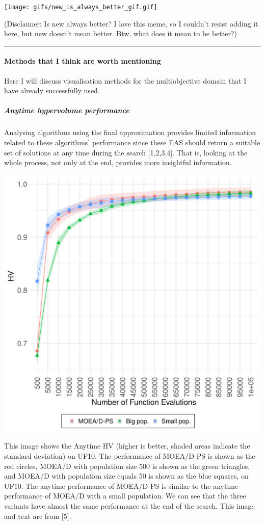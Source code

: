 \documentclass[
]{article}
\begin{document}
\texttt{[image: gifs/new\_is\_always\_better\_gif.gif]}

(Disclaimer: Is new always better? I love this meme, so I couldn't
resist adding it here, but new doesn't mean better. Btw, what does it
mean to be better?)

\begin{center}\rule{0.5\linewidth}{0.5pt}\end{center}

\hypertarget{methods-that-i-think-are-worth-mentioning}{%
\paragraph{Methods that I think are worth
mentioning}\label{methods-that-i-think-are-worth-mentioning}}

Here I will discuss visualisation methods for the multiobjective domain
that I have already successfully used.

\hypertarget{anytime-hypervolume-performance}{%
\subparagraph{Anytime hypervolume
performance}\label{anytime-hypervolume-performance}}

Analysing algorithms using the final approximation provides limited
information related to these algorithms' performance since these EAS
should return a suitable set of solutions at any time during the search
{[}1,2,3,4{]}. That is, looking at the whole process, not only at the
end, provides more insightful information.

\includegraphics[width=0.45\linewidth]{imgs/UF10hv_evolution}

This image shows the Anytime HV (higher is better, shaded areas indicate
the standard deviation) on UF10. The performance of MOEA/D-PS is shown
as the red circles, MOEA/D with population size 500 is shown as the
green triangles, and MOEA/D with population size equals 50 is shown as
the blue squares, on UF10. The anytime performance of MOEA/D-PS is
similar to the anytime performance of MOEA/D with a small population. We
can see that the three variants have almost the same performance at the
end of the search. This image and text are from {[}5{]}.
\end{document}
